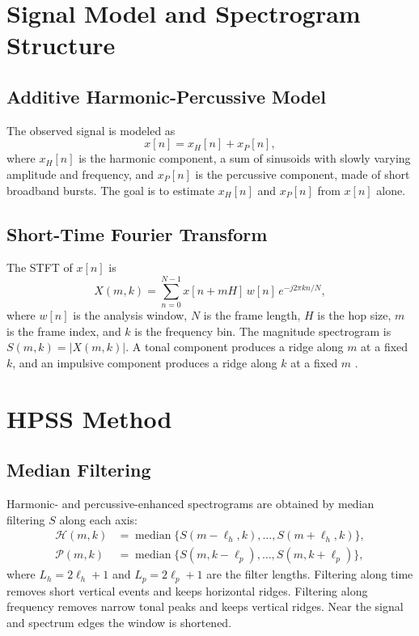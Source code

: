 \documentclass[conference]{IEEEtran}
\begin{document}
\section{Signal Model and Spectrogram Structure}
\subsection{Additive Harmonic-Percussive Model}
The observed signal is modeled as
\begin{equation}
x[n]=x_H[n]+x_P[n],
\end{equation}
where $x_H[n]$ is the harmonic component, a sum of sinusoids with slowly varying amplitude and frequency, and $x_P[n]$ is the percussive component, made of short broadband bursts. The goal is to estimate $x_H[n]$ and $x_P[n]$ from $x[n]$ alone.

\subsection{Short-Time Fourier Transform}
The STFT of $x[n]$ is \cite{allen1977}
\begin{equation}
X(m,k)=\sum_{n=0}^{N-1} x[n+mH]\,w[n]\,e^{-j2\pi kn/N},
\end{equation}
where $w[n]$ is the analysis window, $N$ is the frame length, $H$ is the hop size, $m$ is the frame index, and $k$ is the frequency bin. The magnitude spectrogram is $S(m,k)=|X(m,k)|$. A tonal component produces a ridge along $m$ at a fixed $k$, and an impulsive component produces a ridge along $k$ at a fixed $m$ \cite{oppenheim}.

\section{HPSS Method}
\subsection{Median Filtering}
Harmonic- and percussive-enhanced spectrograms are obtained by median filtering $S$ along each axis:
\begin{align}
\mathcal{H}(m,k) &= \operatorname{median}\{S(m-\ell_h,k),\dots,S(m+\ell_h,k)\},\\
\mathcal{P}(m,k) &= \operatorname{median}\{S(m,k-\ell_p),\dots,S(m,k+\ell_p)\},
\end{align}
where $L_h=2\ell_h+1$ and $L_p=2\ell_p+1$ are the filter lengths. Filtering along time removes short vertical events and keeps horizontal ridges. Filtering along frequency removes narrow tonal peaks and keeps vertical ridges. Near the signal and spectrum edges the window is shortened.
\end{document}
